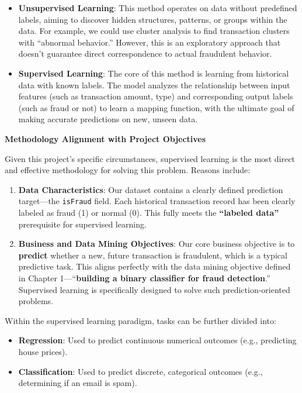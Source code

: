 \documentclass[sigplan,screen]{acmart}
\begin{document}
\begin{itemize}
    \item \textbf{Unsupervised Learning}: This method operates on data without predefined labels, aiming to discover hidden structures, patterns, or groups within the data. For example, we could use cluster analysis to find transaction clusters with ``abnormal behavior.'' However, this is an exploratory approach that doesn't guarantee direct correspondence to actual fraudulent behavior.
    \item \textbf{Supervised Learning}: The core of this method is learning from historical data with known labels. The model analyzes the relationship between input features (such as transaction amount, type) and corresponding output labels (such as fraud or not) to learn a mapping function, with the ultimate goal of making accurate predictions on new, unseen data.
\end{itemize}

\textbf{Methodology Alignment with Project Objectives}

Given this project's specific circumstances, supervised learning is the most direct and effective methodology for solving this problem. Reasons include:

\begin{enumerate}
    \item \textbf{Data Characteristics}: Our dataset contains a clearly defined prediction target---the \texttt{isFraud} field. Each historical transaction record has been clearly labeled as fraud (1) or normal (0). This fully meets the \textbf{``labeled data''} prerequisite for supervised learning.
    \item \textbf{Business and Data Mining Objectives}: Our core business objective is to \textbf{predict} whether a new, future transaction is fraudulent, which is a typical predictive task. This aligns perfectly with the data mining objective defined in Chapter 1---``\textbf{building a binary classifier for fraud detection}.'' Supervised learning is specifically designed to solve such prediction-oriented problems.
\end{enumerate}

Within the supervised learning paradigm, tasks can be further divided into:

\begin{itemize}
    \item \textbf{Regression}: Used to predict continuous numerical outcomes (e.g., predicting house prices).
    \item \textbf{Classification}: Used to predict discrete, categorical outcomes (e.g., determining if an email is spam).
\end{itemize}
\end{document}

